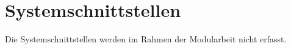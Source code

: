 \section{Systemschnittstellen}
\label{sec:systemschnittstellen}

Die Systemschnittstellen werden im Rahmen der Modularbeit nicht erfasst.
